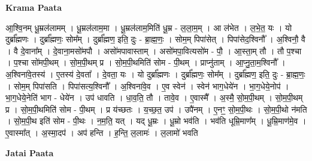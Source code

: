 \documentclass[17pt]{extarticle}
\begin{document}
\textbf{Krama Paata} \newline

आ॒श्वि॒नम् धू॒म्रल॑लामम् । धू॒म्रल॑लाम॒मा । धू॒म्रल॑लाम॒मिति॑ धू॒म्र - ल॒ला॒म॒म् । आ ल॑भेत । ल॒भे॒त॒ यः । यो दुर्ब्रा᳚ह्मणः । दुर्ब्रा᳚ह्मणः॒ सोम᳚म् । दुर्ब्रा᳚ह्मण॒ इति॒ दुः - ब्रा॒ह्म॒णः॒ । सोम॒म् पिपा॑सेत् । पिपा॑सेद॒श्विनौ᳚ । अ॒श्विनौ॒ वै । वै दे॒वाना᳚म् । दे॒वाना॒मसो॑मपौ । असो॑मपावास्ताम् । असो॑मपा॒वित्यसो॑म - पौ॒ । आ॒स्ता॒म् तौ । तौ प॒श्चा । प॒श्चा सो॑मपी॒थम् । सो॒म॒पी॒थम् प्र । सो॒म॒पी॒थमिति॑ सोम - पी॒थम् । प्राप्नु॑ताम् । आ॒प्नु॒ता॒म॒श्विनौ᳚ । अ॒श्विना॑वे॒तस्य॑ । ए॒तस्य॑ दे॒वता᳚ । दे॒वता॒ यः । यो दुर्ब्रा᳚ह्मणः । दुर्ब्रा᳚ह्मणः॒ सोम᳚म् । दुर्ब्रा᳚ह्मण॒ इति॒ दुः - ब्रा॒ह्म॒णः॒ । सोम॒म् पिपा॑सति । पिपा॑सत्य॒श्विनौ᳚ । अ॒श्विना॑वे॒व । ए॒व स्वेन॑ । स्वेन॑ भाग॒धेये॑न । भा॒ग॒धेये॒नोप॑ । भा॒ग॒धेये॒नेति॑ भाग - धेये॑न । उप॑ धावति । धा॒व॒ति॒ तौ । तावे॒व । ए॒वास्मै᳚ । अ॒स्मै॒ सो॒म॒पी॒थम् । सो॒म॒पी॒थम् प्र । सो॒म॒पी॒थमिति॑ सोम - पी॒थम् । प्र य॑च्छतः । य॒च्छ॒त॒ उप॑ । उपै॑नम् । ए॒नꣳ॒॒ सो॒म॒पी॒थः । सो॒म॒पी॒थो न॑मति । सो॒म॒पी॒थ इति॑ सोम - पी॒थः । न॒म॒ति॒ यत् । यद् धू॒म्रः । धू॒म्रो भव॑ति । भव॑ति धूम्रि॒माण᳚म् । धू॒म्रि॒माण॑मे॒व । ए॒वास्मा᳚त् । अ॒स्मा॒दप॑ । अप॑ हन्ति । ह॒न्ति॒ ल॒लामः॑ । ल॒लामो॑ भवति \newline

\textbf{Jatai Paata} \newline
\end{document}
